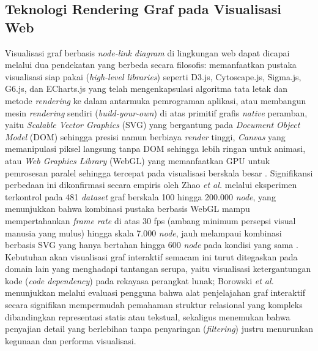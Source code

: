 \subsection{Teknologi Rendering Graf pada Visualisasi Web}
\label{subsec:teknologi-rendering-graf}
Visualisasi graf berbasis \textit{node-link diagram} di lingkungan web dapat dicapai melalui dua pendekatan yang berbeda secara filosofis: memanfaatkan pustaka visualisasi siap pakai (\textit{high-level libraries}) seperti D3.js, Cytoscape.js, Sigma.js, G6.js, dan ECharts.js yang telah mengenkapsulasi algoritma tata letak dan metode \textit{rendering} ke dalam antarmuka pemrograman aplikasi, atau membangun mesin \textit{rendering} sendiri (\textit{build-your-own}) di atas primitif grafis \textit{native} peramban, yaitu \textit{Scalable Vector Graphics} (SVG) yang bergantung pada \textit{Document Object Model} (DOM) sehingga presisi namun berbiaya \textit{render} tinggi, \textit{Canvas} yang memanipulasi piksel langsung tanpa DOM sehingga lebih ringan untuk animasi, atau \textit{Web Graphics Library} (WebGL) yang memanfaatkan GPU untuk pemrosesan paralel sehingga tercepat pada visualisasi berskala besar \cite{Zhao2025}. Signifikansi perbedaan ini dikonfirmasi secara empiris oleh Zhao \textit{et al.} melalui eksperimen terkontrol pada 481 \textit{dataset} graf berskala 100 hingga 200.000 \textit{node}, yang menunjukkan bahwa kombinasi pustaka berbasis WebGL mampu mempertahankan \textit{frame rate} di atas 30 fps (ambang minimum persepsi visual manusia yang mulus) hingga skala 7.000 \textit{node}, jauh melampaui kombinasi berbasis SVG yang hanya bertahan hingga 600 \textit{node} pada kondisi yang sama \cite{Zhao2025}. Kebutuhan akan visualisasi graf interaktif semacam ini turut ditegaskan pada domain lain yang menghadapi tantangan serupa, yaitu visualisasi ketergantungan kode (\textit{code dependency}) pada rekayasa perangkat lunak; Borowski \textit{et al.} \cite{Borowski2022GraphBuddy} menunjukkan melalui evaluasi pengguna bahwa alat penjelajahan graf interaktif secara signifikan mempermudah pemahaman struktur relasional yang kompleks dibandingkan representasi statis atau tekstual, sekaligus menemukan bahwa penyajian detail yang berlebihan tanpa penyaringan (\textit{filtering}) justru menurunkan kegunaan dan performa visualisasi.

